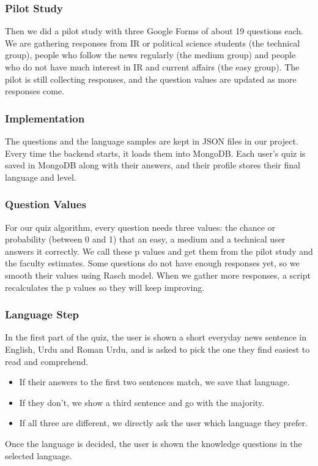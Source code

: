 \documentclass{FastFyp}
\begin{document}
\subsubsection{Pilot Study}
Then we did a pilot study with three Google Forms of about 19 questions each. We are gathering responses from IR or political science students (the technical group), people who follow the news regularly (the medium group) and people who do not have much interest in IR and current affairs (the easy group). The pilot is still collecting responses, and the question values are updated as more responses come.

\subsubsection{Implementation}
The questions and the language samples are kept in JSON files in our project. Every time the backend starts, it loads them into MongoDB. Each user's quiz is saved in MongoDB along with their answers, and their profile stores their final language and level.

\subsubsection{Question Values}
For our quiz algorithm, every question needs three values: the chance or probability (between 0 and 1) that an easy, a medium and a technical user answers it correctly. We call these p values and get them from the pilot study and the faculty estimates. Some questions do not have enough responses yet, so we smooth their values using Rasch model. When we gather more responses, a script recalculates the p values so they will keep improving.

\subsubsection{Language Step}
In the first part of the quiz, the user is shown a short everyday news sentence in English, Urdu and Roman Urdu, and is asked to pick the one they find easiest to read and comprehend.
\begin{itemize}
    \item If their answers to the first two sentences match, we save that language.
    \item If they don't, we show a third sentence and go with the majority.
    \item If all three are different, we directly ask the user which language they prefer.
\end{itemize}
Once the language is decided, the user is shown the knowledge questions in the selected language.
\end{document}
